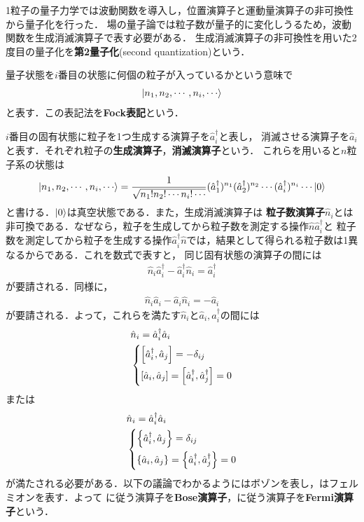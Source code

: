\documentclass{report}
\begin{document}
1粒子の量子力学では波動関数を導入し，位置演算子と運動量演算子の非可換性から量子化を行った．
場の量子論では粒子数が量子的に変化しうるため，波動関数を生成消滅演算子で表す必要がある．
生成消滅演算子の非可換性を用いた2度目の量子化を\textbf{第2量子化}(second quantization)という．

量子状態を$i$番目の状態に何個の粒子が入っているかという意味で
\begin{align}
  \ket{n_1,n_2,\cdots,n_i,\cdots}
\end{align}
と表す．この表記法を\textbf{Fock表記}という．

$i$番目の固有状態に粒子を1つ生成する演算子を$\hat{a}_i^{\dagger}$と表し，
消滅させる演算子を$\hat{a}_i$と表す．それぞれ粒子の\textbf{生成演算子}，\textbf{消滅演算子}という．
これらを用いると$n$粒子系の状態は
\begin{align}
  \ket{n_1,n_2,\cdots,n_i,\cdots} = \frac{1}{\sqrt{n_1!n_2!\cdots n_i!\cdots}}(\hat{a}_1^{\dagger})^{n_1}(\hat{a}_2^{\dagger})^{n_2}\cdots(\hat{a}_i^{\dagger})^{n_i}\cdots\ket{0}
\end{align}
と書ける．$\ket{0}$は真空状態である．また，生成消滅演算子は
\textbf{粒子数演算子}$\hat{n}_i$とは非可換である．なぜなら，粒子を生成してから粒子数を測定する操作$\hat{n}\hat{a}^{\dagger}_i$と
粒子数を測定してから粒子を生成する操作$\hat{a}_i^{\dagger}\hat{n}$では，結果として得られる粒子数は1異なるからである．これを数式で表すと，
同じ固有状態の演算子の間には
\begin{align}
  \hat{n}_i\hat{a}^{\dagger}_i - \hat{a}^{\dagger}_i\hat{n}_i = \hat{a}^{\dagger}_i
\end{align}
が要請される．同様に，
\begin{align}
  \hat{n}_i\hat{a}_i - \hat{a}_i\hat{n}_i = -\hat{a}_i
\end{align}
が要請される．よって，これらを満たす$\hat{n}_i$と$\hat{a}_i,\hat{a}_i^{\dagger}$の間には
\begin{align}
  &\hat{n}_i = \hat{a}_i^{\dagger}\hat{a}_i\\
  &\begin{dcases}
    \qty[\hat{a}^{\dagger}_i,\hat{a}_j] = -\delta_{ij}\\
    \qty[\hat{a}_i,\hat{a}_j] = \qty[\hat{a}_i^{\dagger},\hat{a}^{\dagger}_j] = 0
  \label{boson-com}
  \end{dcases}
\end{align}
または
\begin{align}
  &\hat{n}_i = \hat{a}^{\dagger}_i\hat{a}_i\\
  &\begin{dcases}
    \qty{\hat{a}_i^{\dagger},\hat{a}_j} = \delta_{ij}\\
    \qty{\hat{a}_i,\hat{a}_j} = \qty{\hat{a}_i^{\dagger},\hat{a}_j^{\dagger}} = 0
  \label{fermion-com}
  \end{dcases}
\end{align}
が満たされる必要がある．以下の議論でわかるようにはボゾンを表し，はフェルミオンを表す．よって
に従う演算子を\textbf{Bose演算子}，に従う演算子を\textbf{Fermi演算子}という．
\end{document}
